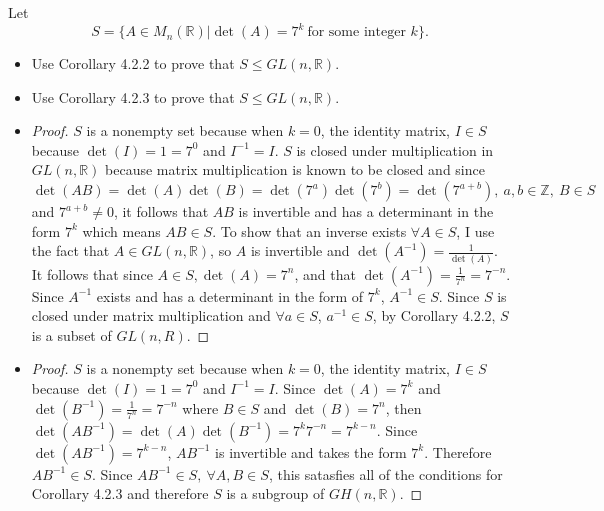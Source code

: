 \documentclass[titlepage]{article}
\newenvironment{problem}[2][Problem]{\begin{trivlist}
\item[\hskip \labelsep {\bfseries #1}\hskip \labelsep {\bfseries #2.}]}{\end{trivlist}}
\begin{document}
 
 
\fancyhf{}
\cfoot{\thepage}

\begin{problem}{1}
Let
$$ S = \{A \in M_n(\mathbb{R}) | \det(A) = 7^k \ \text{for some integer }k\}. $$
\begin{itemize}
\item[(a)] Use Corollary 4.2.2 to prove that $S \leq GL(n,\mathbb{R})$.
\item[(b)] Use Corollary 4.2.3 to prove that $S \leq GL(n,\mathbb{R})$.
\end{itemize}
\hrulefill
\begin{itemize}
\item[(a)] \begin{proof}
$S$ is a nonempty set because when $k=0$, the identity matrix, $I \in S$ because $\det(I) = 1 = 7^0$ and $I^{-1} = I$. $S$ is closed under multiplication in $GL(n,\mathbb{R})$ because matrix multiplication is known to be closed and since $\det(AB) = \det(A)\det(B) = \det(7^a)\det(7^b) = \det(7^{a+b}),\ a,b\in\mathbb{Z} ,\ B \in S$ and $7^{a+b} \neq 0$, it follows that $AB$ is invertible and has a determinant in the form $7^k$ which means $AB \in S$. To show that an inverse exists $\forall A \in S$, I use the fact that $A\in GL(n,\mathbb{R})$, so $A$ is invertible and $\det(A^{-1}) = \frac{1}{\det(A)}$. It follows that since $A\in S, \det(A) = 7^n$, and that $\det(A^{-1}) = \frac{1}{7^n} = 7^{-n}$. Since $A^{-1}$ exists and has a determinant in the form of $7^k$, $A^{-1} \in S$. Since $S$ is closed under matrix multiplication and $\forall a\in S$, $a^{-1} \in S$, by Corollary 4.2.2, $S$ is a subset of $GL(n,R)$.\end{proof}

\item[(b)]\begin{proof}
$S$ is a nonempty set because when $k=0$, the identity matrix, $I \in S$ because $\det(I) = 1 = 7^0$ and $I^{-1} = I$. Since $\det(A) = 7^k$ and $\det(B^{-1}) = \frac{1}{7^n} = 7^{-n}$ where $B \in S$ and $\det(B)=7^n$, then $\det(AB^{-1}) = \det(A)\det(B^{-1}) = 7^k 7^{-n} = 7^{k-n }.$ Since $\det(AB^{-1}) = 7^{k-n}$, $AB^{-1}$ is invertible and takes the form $7^k$. Therefore $AB^{-1} \in S$. Since $AB^{-1} \in S, \ \forall A,B \in S$, this satasfies all of the conditions for Corollary 4.2.3 and therefore $S$ is a subgroup of $GH(n,\mathbb{R})$.  
\end{proof}
\end{itemize}
\end{problem}
\end{document}
